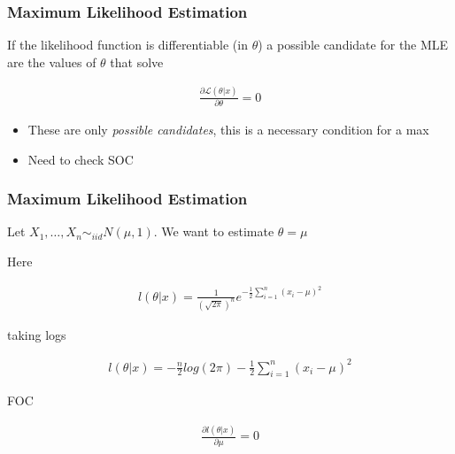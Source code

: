 \documentclass[
  shownotes,
  xcolor={svgnames},
  hyperref={colorlinks,citecolor=DarkBlue,linkcolor=DarkRed,urlcolor=DarkBlue}
  , aspectratio=169]{beamer}
\begin{document}

\begin{frame}[fragile]
\frametitle{Maximum Likelihood Estimation}
If the likelihood function is differentiable (in $\theta$) a possible candidate for the MLE are the values of $\theta$ that solve

\begin{align}
  \frac{\partial \mathcal{L}(\theta|x)}{\partial \theta} = 0
\end{align}

\begin{itemize}
\item These are  only {\it possible candidates}, this is a necessary condition for a max
\item Need to check SOC
\end{itemize}

\end{frame}

\begin{frame}[fragile]
\frametitle{Maximum Likelihood Estimation}

 Let $X_1,\dots,X_n \sim_{iid} N(\mu,1)$. We want to estimate $\theta = \mu$

Here

\begin{align}
l(\theta |x)=\frac{1}{(\sqrt{2\pi})^{n}}e^{-\frac{1}{2}\sum_{i=1}^{n}(x_i-\mu)^2}
\end{align}


taking logs 

\begin{align}
l\left(\theta |x\right)=-\frac{n}{2}log\left(2\pi\right)-\frac{1}{2}\sum_{i=1}^{n}(x_i-\mu)^2
\end{align}

FOC

\begin{align}
\frac{\partial l\left(\theta |x\right)}{\partial\mu}=0
\end{align}


\end{frame}
\end{document}
